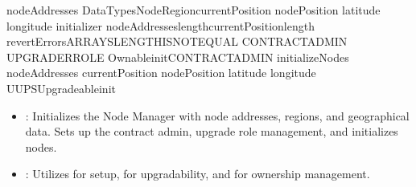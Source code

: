 \documentclass[letterpaper,10pt,english]{sphinxmanual}
\begin{document}
\begin{sphinxVerbatim}[commandchars=\\\{\}]
\PYG{p}{[}\PYG{p}{]}\PYGZus{}nodeAddresses
DataTypesNodeRegion\PYG{p}{[}\PYG{p}{]}\PYGZus{}currentPosition
\PYG{p}{[}\PYG{p}{]}nodePosition
\PYG{p}{[}\PYG{p}{]}latitude
\PYG{p}{[}\PYG{p}{]}longitude
initializer
\PYGZus{}nodeAddresseslength\PYGZus{}currentPositionlength
revertErrorsARRAYS\PYGZus{}LENGTH\PYGZus{}IS\PYGZus{}NOT\PYGZus{}EQUAL
CONTRACT\PYGZus{}ADMIN
UPGRADER\PYGZus{}ROLE
\PYGZus{}\PYGZus{}Ownable\PYGZus{}initCONTRACT\PYGZus{}ADMIN
\PYGZus{}initializeNodes
\PYGZus{}nodeAddresses
\PYGZus{}currentPosition
nodePosition
latitude
longitude
\PYGZus{}\PYGZus{}UUPSUpgradeable\PYGZus{}init
\end{sphinxVerbatim}
\begin{itemize}
\item {} 
\sphinxAtStartPar
{}: Initializes the Node Manager with node addresses, regions, and geographical data. Sets up the contract admin, upgrade role management, and initializes nodes.

\item {} 
\sphinxAtStartPar
{}: Utilizes  for setup,  for upgradability, and  for ownership management.

\end{itemize}
\end{document}
